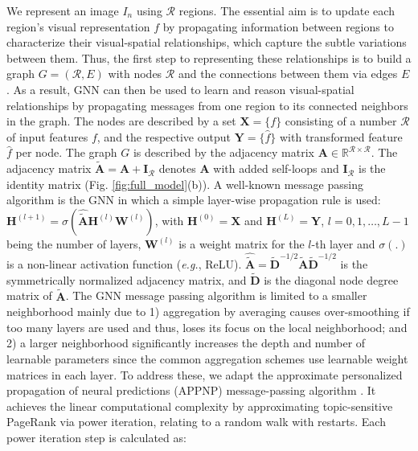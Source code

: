 \documentclass[journal]{IEEEtran}
\begin{document}
We represent an image $I_n$ using  $\mathcal{R}$ regions. The essential aim is to update each region's visual representation $f$ by propagating information between regions to characterize their visual-spatial relationships, which capture the subtle variations between them. Thus, the first step to representing these relationships is to build a graph $G=(\mathcal{R},E)$ with nodes $\mathcal{R}$ and the connections between them via edges $E$. As a result, GNN can then be used to learn and reason visual-spatial relationships by propagating messages from one region to its connected neighbors in the graph. The nodes are described by a set $\mathbf{X}=\{f\}$ consisting of a number $\mathcal{R}$  of input features $f$, and the respective output $\mathbf{Y} = \{\hat{f}\}$ with transformed feature $\hat{f}$ per node. The graph $G$ is described by the adjacency matrix $\mathbf{A} \in \mathbb{R}^{\mathcal{R}\times \mathcal{R}}$. The adjacency matrix $\tilde{\mathbf{A}}=\mathbf{A}+\mathbf{I}_{\mathcal{R}}$ denotes $\mathbf{A}$ with added self-loops and $\mathbf{I}_{\mathcal{R}}$ is the identity matrix (Fig. \ref{fig:full_model}(b)). A well-known message passing algorithm is the GNN \cite{kipf2016semi} in which a simple layer-wise propagation rule is used: $\mathbf{H}^{(l+1)} = \sigma\left(\hat{\tilde{\mathbf{A}}}\mathbf{H}^{(l)}\mathbf{W}^{(l)}\right)$, with $\mathbf{H}^{(0)}=\mathbf{X}$ and $\mathbf{H}^{(L)}=\mathbf{Y}$, $l=0, 1, \dots, L-1$ being the number of layers, $\mathbf{W}^{(l)}$ is a weight matrix for the $l$-th layer and $\sigma(.)$ is a non-linear activation function (\textit{e.g.}, ReLU). $\hat{\tilde{\mathbf{A}}}=\tilde{\mathbf{D}}^{−1/2}\tilde{\mathbf{A}}\tilde{\mathbf{D}}^{−1/2}$ is the symmetrically normalized adjacency matrix, and $\tilde{\mathbf{D}}$ is the diagonal node degree matrix of $\tilde{\mathbf{A}}$. The GNN message passing algorithm is limited to a smaller neighborhood mainly due to 1) aggregation by averaging causes over-smoothing if too many layers are used and thus, loses its focus on the local neighborhood; and 2) a larger neighborhood significantly increases the depth and number of learnable parameters since the common aggregation schemes use learnable weight matrices in each layer. To address these, we adapt the approximate personalized propagation of neural predictions (APPNP) message-passing algorithm \cite{klicpera2018predict}. It achieves the linear computational complexity by approximating topic-sensitive PageRank via power iteration, relating to a random walk with restarts. Each power iteration step is calculated as: \vspace{-.1cm}
\end{document}
